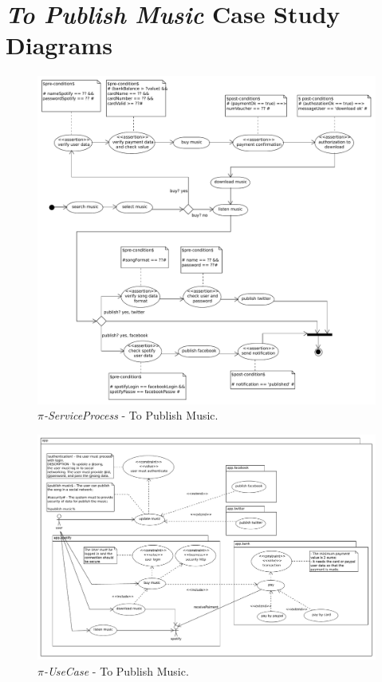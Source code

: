   

\chapter{\textit{To Publish Music} Case Study Diagrams}
\label{append:diagrams}
  

\begin{figure}[ht!]
\centering
\includegraphics[width=.99\textwidth]{chapters/methodology/figs/piserviceprocess/runningExampleSP_final.pdf}
\caption{\textit{$\pi$-ServiceProcess} - To Publish Music.}
\label{figApp:serviceprocessContract}
\end{figure}
  
\begin{landscape} 
\begin{figure} 
\centering
\includegraphics[width=1.4\textwidth]{chapters/state_ofthe_art/figsAppendix/toPublishMusicCompleto.pdf}
\caption{\textit{$\pi$-UseCase} - To Publish Music.}
\label{figApp:toPublishMusicCompleto}
\end{figure} 
\end{landscape}

